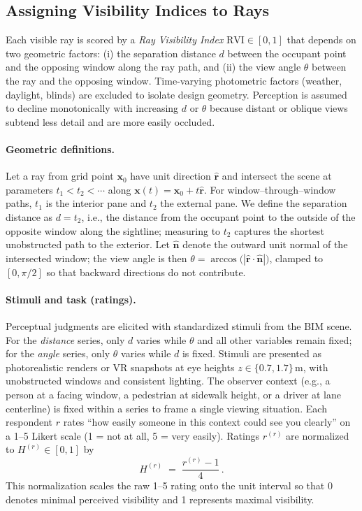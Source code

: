 \documentclass[final,3p,times,review]{elsarticle}
\begin{document}
\subsection{Assigning Visibility Indices to Rays}
\label{sec:rvi}
Each visible ray is scored by a \emph{Ray Visibility Index} $\mathrm{RVI}\in[0,1]$ that depends on two geometric factors: (i) the separation distance $d$ between the occupant point and the opposing window along the ray path, and (ii) the view angle $\theta$ between the ray and the opposing window. Time-varying photometric factors (weather, daylight, blinds) are excluded to isolate design geometry. Perception is assumed to decline monotonically with increasing $d$ or $\theta$ because distant or oblique views subtend less detail and are more easily occluded.

\paragraph{Geometric definitions.}
Let a ray from grid point $\mathbf{x}_0$ have unit direction $\hat{\mathbf{r}}$ and intersect the scene at parameters $t_1<t_2<\cdots$ along $\mathbf{x}(t)=\mathbf{x}_0+t\hat{\mathbf{r}}$. For window–through–window paths, $t_1$ is the interior pane and $t_2$ the external pane. We define the separation distance as $d = t_2$, i.e., the distance from the occupant point to the outside of the opposite window along the sightline; measuring to $t_2$ captures the shortest unobstructed path to the exterior. Let $\hat{\mathbf{n}}$ denote the outward unit normal of the intersected window; the view angle is then $\theta = \arccos\!\big(|\hat{\mathbf{r}}\!\cdot\!\hat{\mathbf{n}}|\big)$, clamped to $[0,\pi/2]$ so that backward directions do not contribute.

\paragraph{Stimuli and task (ratings).}
Perceptual judgments are elicited with standardized stimuli from the BIM scene. For the \emph{distance} series, only $d$ varies while $\theta$ and all other variables remain fixed; for the \emph{angle} series, only $\theta$ varies while $d$ is fixed. Stimuli are presented as photorealistic renders or VR snapshots at eye heights $z\in\{0.7,1.7\}$\,m, with unobstructed windows and consistent lighting. The observer context (e.g., a person at a facing window, a pedestrian at sidewalk height, or a driver at lane centerline) is fixed within a series to frame a single viewing situation. Each respondent $r$ rates “how easily someone in this context could see you clearly” on a 1–5 Likert scale (1 = not at all, 5 = very easily). Ratings $r^{(r)}$ are normalized to $H^{(r)}\in[0,1]$ by
\begin{equation}
H^{(r)} \;=\; \frac{r^{(r)}-1}{4}\,.
\label{eq:rating-normalization}
\end{equation}
This normalization scales the raw 1--5 rating onto the unit interval so that 0 denotes minimal perceived visibility and 1 represents maximal visibility.
\end{document}
